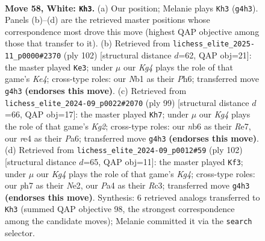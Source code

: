 \documentclass[11pt]{article}
\begin{document}
\clearpage

\begin{figure}[p]\centering
\begin{subfigure}{0.46\textwidth}\centering
\resizebox{\linewidth}{!}{%
\newchessgame
\chessboard[
  setfen={7k/5p1p/1n4p1/p3p1P1/P3r1KP/1P4R1/6P1/RN3r2 w - - 0 58},
  showmover=false,
  pgfstyle=straightmove, color=movearrow, markmove={g4-h3}
]}
\caption{}
\end{subfigure}\hfill
\begin{subfigure}{0.46\textwidth}\centering
\resizebox{\linewidth}{!}{%
\newchessgame
\chessboard[
  setfen={8/2p4r/1p2kr1P/p1p1p2R/P3K2R/1P1P4/2P5/8 w - - 17 52},
  showmover=false,
  pgfstyle=straightmove, color=movearrow, markmove={e4-e3}
]}
\caption{}
\end{subfigure}
\\[4pt]
\begin{subfigure}{0.46\textwidth}\centering
\resizebox{\linewidth}{!}{%
\newchessgame
\chessboard[
  setfen={8/4rpk1/p2Np3/P1p1n1rP/4P1p1/1PP5/2K3R1/5R2 b - - 5 50},
  showmover=false,
  pgfstyle=straightmove, color=movearrow, markmove={g7-h7}
]}
\caption{}
\end{subfigure}\hfill
\begin{subfigure}{0.46\textwidth}\centering
\resizebox{\linewidth}{!}{%
\newchessgame
\chessboard[
  setfen={8/3r2pk/1bp2p2/p3pPp1/1r2P1K1/1PRP3P/2R1N1P1/8 w - - 8 52},
  showmover=false,
  pgfstyle=straightmove, color=movearrow, markmove={g4-f3}
]}
\caption{}
\end{subfigure}
\caption{\textbf{Move 58, White: \texttt{Kh3}.} (a) Our position; Melanie plays \texttt{Kh3} (\texttt{g4h3}). Panels (b)--(d) are the retrieved master positions whose correspondence most drove this move (highest QAP objective among those that transfer to it). (b) Retrieved from \texttt{lichess\_elite\_2025-11\_p0000\#2370} (ply 102) [structural distance $d$=62, QAP obj=21]: the master played \texttt{Ke3}; under $\mu$ our \emph{Kg4} plays the role of that game's \emph{Ke4}; cross-type roles: our \emph{N}b1 as their \emph{P}h6; transferred move \texttt{g4h3} \textbf{(endorses this move)}. (c) Retrieved from \texttt{lichess\_elite\_2024-09\_p0022\#2070} (ply 99) [structural distance $d$=66, QAP obj=17]: the master played \texttt{Kh7}; under $\mu$ our \emph{Kg4} plays the role of that game's \emph{Kg2}; cross-type roles: our \emph{n}b6 as their \emph{R}e7, our \emph{r}e4 as their \emph{P}a6; transferred move \texttt{g4h3} \textbf{(endorses this move)}. (d) Retrieved from \texttt{lichess\_elite\_2024-09\_p0012\#59} (ply 102) [structural distance $d$=65, QAP obj=11]: the master played \texttt{Kf3}; under $\mu$ our \emph{Kg4} plays the role of that game's \emph{Kg4}; cross-type roles: our \emph{p}h7 as their \emph{N}e2, our \emph{P}a4 as their \emph{R}c3; transferred move \texttt{g4h3} \textbf{(endorses this move)}. Synthesis: 6 retrieved analogs transferred to \texttt{Kh3} (summed QAP objective 98, the strongest correspondence among the candidate moves); Melanie committed it via the \texttt{search} selector.}
\label{fig:thought-m114}
\end{figure}
\end{document}
